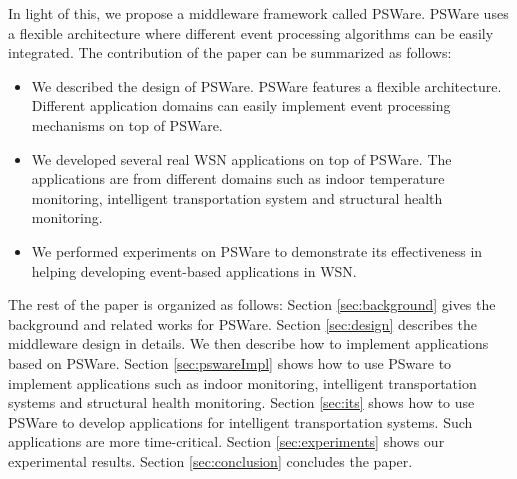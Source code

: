In light of this, we propose a middleware framework called PSWare. PSWare uses a flexible architecture where different event processing algorithms can be easily integrated. The contribution of the paper can be summarized as follows:
\begin{itemize}
\item We described the design of PSWare. PSWare features a flexible architecture. Different application domains can easily implement event processing mechanisms on top of PSWare.
\item We developed several real WSN applications on top of PSWare. The applications are from different domains such as indoor temperature monitoring, intelligent transportation system and structural health monitoring.
\item We performed experiments on PSWare to demonstrate its effectiveness in helping developing event-based applications in WSN.
\end{itemize}

The rest of the paper is organized as follows: Section \ref{sec:background} gives the background and related works for PSWare. Section \ref{sec:design} describes the middleware design in details. We then describe how to implement applications based on PSWare. Section \ref{sec:pswareImpl} shows how to use PSware to implement applications such as indoor monitoring, intelligent transportation systems and structural health monitoring. Section \ref{sec:its} shows how to use PSWare to develop applications for intelligent transportation systems. Such applications are more time-critical. Section \ref{sec:experiments} shows our experimental results. Section \ref{sec:conclusion} concludes the paper.